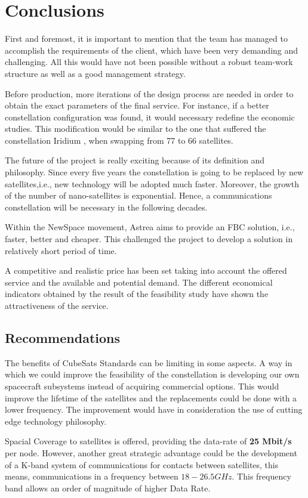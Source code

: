 \chapter{Conclusions}

First and foremost, it is important to mention that the team has managed to accomplish the requirements of the client, which have been very demanding and challenging. All this would have not been possible without a robust team-work structure as well as a good management strategy.

Before production, more iterations of the design process are needed in order to obtain the exact parameters of the final service. For instance, if a better constellation configuration was found, it would necessary redefine the economic studies. This modification would be similar to the one that suffered the constellation Iridium \cite{Iridium}, when swapping from 77 to 66 satellites.

The future of the project is really exciting because of its definition and philosophy. Since every five years the constellation is going to be replaced by new satellites,i.e., new technology will be adopted much faster. Moreover, the growth of the number of nano-satellites is exponential. Hence, a communications constellation will be necessary in the following decades.

Within the NewSpace movement, Astrea aims to provide an FBC solution, i.e., faster, better and cheaper. This challenged the project to develop a solution in relatively short period of time.  

A competitive and realistic price has been set taking into account the offered service and the available and potential demand. The different economical indicators obtained by the result of the feasibility study have shown the attractiveness of the service.

\section{Recommendations}
The benefits of CubeSats Standards can be limiting in some aspects. A way in which we could improve the feasibility of the constellation is developing our own spacecraft subsystems instead of acquiring commercial options. This would improve the lifetime of the satellites and the replacements could be done with a lower frequency. The improvement would have in consideration the use of cutting edge technology philosophy.

Spacial Coverage to satellites is offered, providing the data-rate of \textbf{25 Mbit/s} per node. However, another great strategic advantage could be the development of a K-band system of communications for contacts between satellites, this means, communications in a frequency between $18-26.5 GHz$. This frequency band allows an order of magnitude of higher Data Rate. 
